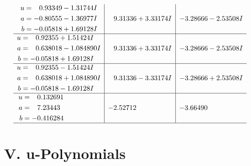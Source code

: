 \documentclass[1p]{elsarticle_modified}
\theoremstyle{definition}
\begin{document}
$$\begin{array}{c|c|c}
\begin{aligned}
u &= \phantom{-}0.93349 - 1.31744 I \\
a &= -0.80555 - 1.36977 I \\
b &= -0.05818 + 1.69128 I\end{aligned}
 & \phantom{-}9.31336 + 3.33174 I & -3.28666 - 2.53508 I \\ \hline\begin{aligned}
u &= \phantom{-}0.92355 + 1.51424 I \\
a &= \phantom{-}0.638018 - 1.084890 I \\
b &= -0.05818 + 1.69128 I\end{aligned}
 & \phantom{-}9.31336 + 3.33174 I & -3.28666 - 2.53508 I \\ \hline\begin{aligned}
u &= \phantom{-}0.92355 - 1.51424 I \\
a &= \phantom{-}0.638018 + 1.084890 I \\
b &= -0.05818 - 1.69128 I\end{aligned}
 & \phantom{-}9.31336 - 3.33174 I & -3.28666 + 2.53508 I \\ \hline\begin{aligned}
u &= \phantom{-}0.132691\phantom{ +0.000000I} \\
a &= \phantom{-}7.23443\phantom{ +0.000000I} \\
b &= -0.416284\phantom{ +0.000000I}\end{aligned}
 & -2.52712\phantom{ +0.000000I} & -3.66490\phantom{ +0.000000I}\\
 \hline 
 \end{array}$$\newpage
\newpage\renewcommand{\arraystretch}{1}
\centering \section*{ V. u-Polynomials}
\end{document}
